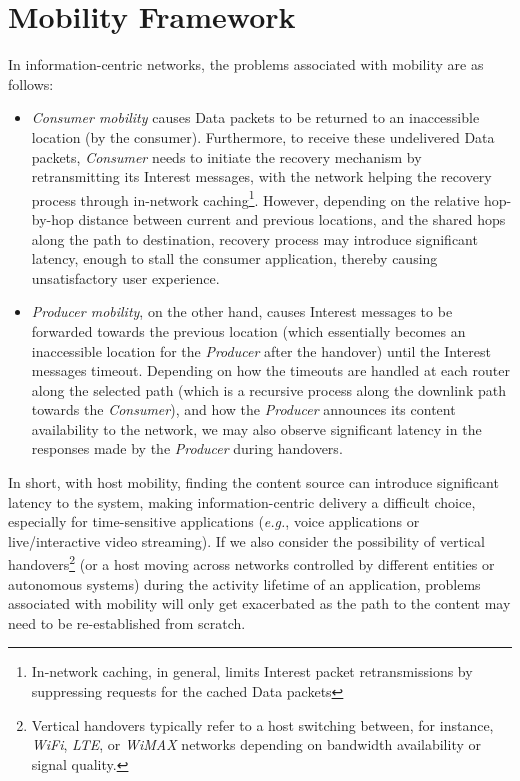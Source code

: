 \documentclass[conference]{IEEEtran}
\begin{document}
\section{Mobility Framework}\label{Section:Mobility}

In information-centric networks, the problems associated with mobility are as follows:
\begin{itemize}
    \item \emph{Consumer mobility} causes Data packets to be returned to an inaccessible location (by the consumer). Furthermore, to receive these undelivered Data packets, \emph{Consumer} needs to initiate the recovery mechanism by retransmitting its Interest messages, with the network helping the recovery process through in-network caching\footnote{In-network caching, in general, limits Interest packet retransmissions by suppressing requests for the cached Data packets}. However, depending on the relative hop-by-hop distance between current and previous locations, and the shared hops along the path to destination, recovery process may introduce significant latency, enough to stall the consumer application, thereby causing unsatisfactory user experience.
    \item \emph{Producer mobility}, on the other hand, causes Interest messages to be forwarded towards the previous location (which essentially becomes an inaccessible location for the \emph{Producer} after the handover) until the Interest messages timeout. Depending on how the timeouts are handled at each router along the selected path (which is a recursive process along the downlink path towards the \emph{Consumer}), and how the \emph{Producer} announces its content availability to the network, we may also observe significant latency in the responses made by the \emph{Producer} during handovers.
\end{itemize}

In short, with host mobility, finding the content source can introduce significant latency to the system, making information-centric delivery a difficult choice, especially for time-sensitive applications (\emph{e.g.}, voice applications or live/interactive video streaming). If we also consider the possibility of vertical handovers\footnote{Vertical handovers typically refer to a host switching between, for instance, \emph{WiFi}, \emph{LTE}, or \emph{WiMAX} networks depending on bandwidth availability or signal quality.} (or a host moving across networks controlled by different entities or autonomous systems) during the activity lifetime of an application, problems associated with mobility will only get exacerbated as the path to the content may need to be re-established from scratch.
\end{document}
